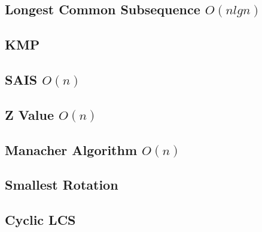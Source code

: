 \documentclass[a4paper,10pt,twocolumn,oneside]{article}
\begin{document}
\subsection{Longest Common Subsequence $O(nlgn)$}


\subsection{KMP}


\subsection{SAIS $O(n)$}


%

\subsection{Z Value $O(n)$}


%

\subsection{Manacher Algorithm $O(n)$}


\subsection{Smallest Rotation}


%

\subsection{Cyclic LCS}

\end{document}
